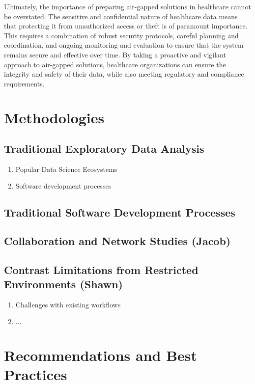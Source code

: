 \documentclass{amia}
\begin{document}
Ultimately, the importance of preparing air-gapped solutions in healthcare cannot be overstated. The sensitive and confidential nature of healthcare data means that protecting it from unauthorized access or theft is of paramount importance. This requires a combination of robust security protocols, careful planning and coordination, and ongoing monitoring and evaluation to ensure that the system remains secure and effective over time. By taking a proactive and vigilant approach to air-gapped solutions, healthcare organizations can ensure the integrity and safety of their data, while also meeting regulatory and compliance requirements.

\section{Methodologies}

\subsection{Traditional Exploratory Data Analysis}

        \begin{enumerate}
            \item Popular Data Science Ecosystems
            \item Software development processes
        \end{enumerate}

\subsection{Traditional Software Development Processes} 

\subsection{Collaboration and Network Studies (Jacob)}

\subsection{Contrast Limitations from Restricted Environments (Shawn)}
        \begin{enumerate}
            \item Challenges with existing workflows
            \item ...
        \end{enumerate}


\section*{Recommendations and Best Practices}
\end{document}
